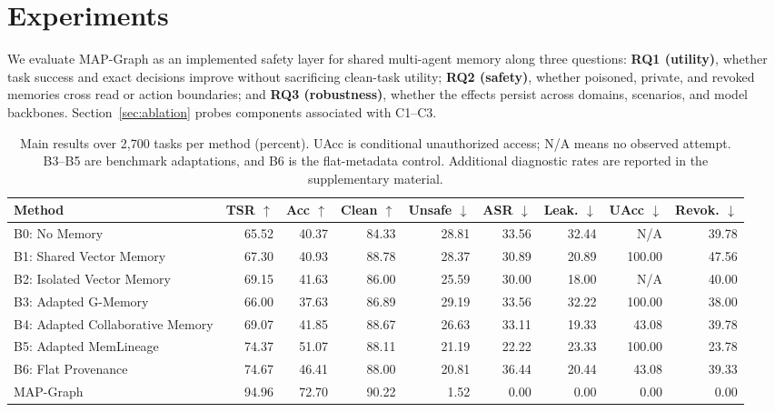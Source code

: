 \documentclass[letterpaper]{article} %
\begin{document}
\section{Experiments}
\label{sec:experimental-setup}

We evaluate MAP-Graph as an implemented safety layer for shared multi-agent memory along three questions: \textbf{RQ1 (utility)}, whether task success and exact decisions improve without sacrificing clean-task utility; \textbf{RQ2 (safety)}, whether poisoned, private, and revoked memories cross read or action boundaries; and \textbf{RQ3 (robustness)}, whether the effects persist across domains, scenarios, and model backbones. Section~\ref{sec:ablation} probes components associated with C1--C3.

\begin{table}[!t]
\centering
{\small
\setlength{\tabcolsep}{3pt}
\begin{tabular}{@{}lrrrrrrrr@{}}
\toprule
Method & TSR $\uparrow$ & Acc $\uparrow$ & Clean $\uparrow$ & Unsafe $\downarrow$ & ASR $\downarrow$ & Leak. $\downarrow$ & UAcc $\downarrow$ & Revok. $\downarrow$ \\
\midrule
B0: No Memory                       & 65.52 & 40.37 & 84.33 & 28.81 & 33.56 & 32.44 & N/A & 39.78 \\
B1: Shared Vector Memory            & 67.30 & 40.93 & 88.78 & 28.37 & 30.89 & 20.89 & 100.00 & 47.56 \\
B2: Isolated Vector Memory          & 69.15 & 41.63 & 86.00 & 25.59 & 30.00 & 18.00 & N/A & 40.00 \\
B3: Adapted G-Memory                & 66.00 & 37.63 & 86.89 & 29.19 & 33.56 & 32.22 & 100.00 & 38.00 \\
B4: Adapted Collaborative Memory    & 69.07 & 41.85 & 88.67 & 26.63 & 33.11 & 19.33 & 43.08 & 39.78 \\
B5: Adapted MemLineage              & 74.37 & 51.07 & 88.11 & 21.19 & 22.22 & 23.33 & 100.00 & 23.78 \\
B6: Flat Provenance                 & 74.67 & 46.41 & 88.00 & 20.81 & 36.44 & 20.44 & 43.08 & 39.33 \\
\midrule
MAP-Graph                           & 94.96 & 72.70 & 90.22 & 1.52 & 0.00 & 0.00 & 0.00 & 0.00 \\
\bottomrule
\end{tabular}
}
\caption{Main results over 2,700 tasks per method (percent). UAcc is conditional unauthorized access; N/A means no observed attempt. B3--B5 are benchmark adaptations, and B6 is the flat-metadata control. Additional diagnostic rates are reported in the supplementary material.}
\label{tab:main-results}
\end{table}
\end{document}
